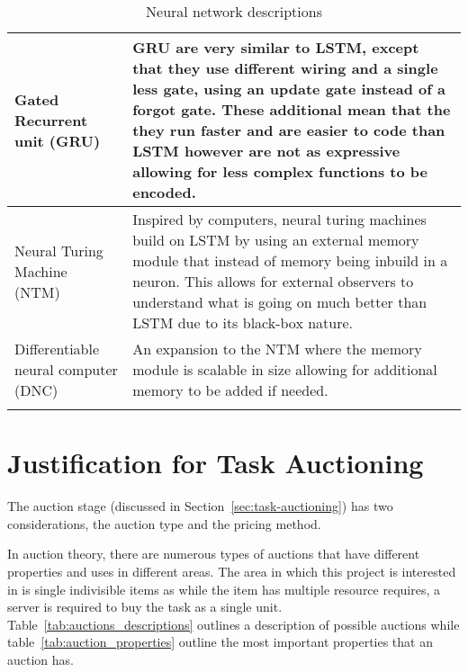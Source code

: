 \begin{longtable}{|p{3.5cm}|p{11cm}|}
    Gated Recurrent unit (GRU)~\cite{GRU} & GRU are very similar to LSTM, except that they use different wiring and a
        single less gate, using an update gate instead of a forgot gate. These additional mean that the they run faster
        and are easier to code than LSTM however are not as expressive allowing for less complex functions to be
        encoded. \\ \hline

    Neural Turing Machine (NTM)~\cite{NTM} & Inspired by computers, neural turing machines build on LSTM by using an
        external memory module that instead of memory being inbuild in a neuron. This allows for external observers to
        understand what is going on much better than LSTM due to its black-box nature. \\ \hline

    Differentiable neural computer (DNC)~\cite{DNC} & An expansion to the NTM where the memory module is scalable in
        size allowing for additional memory to be added if needed. \\ \hline

    \caption{Neural network descriptions}
    \label{tab:neural_network_description}
\end{longtable}

\section{Justification for Task Auctioning}\label{sec:justification-for-task-auctioning}
The auction stage (discussed in Section~\ref{sec:task-auctioning}) has two considerations, the auction type and the pricing method.

In auction theory, there are numerous types of auctions that have different properties and uses in different areas.
The area in which this project is interested in is single indivisible items as while the item has multiple resource
requires, a server is required to buy the task as a single unit. Table~\ref{tab:auctions_descriptions} outlines a
description of possible auctions while table~\ref{tab:auction_properties} outline the most important properties that
an auction has.


